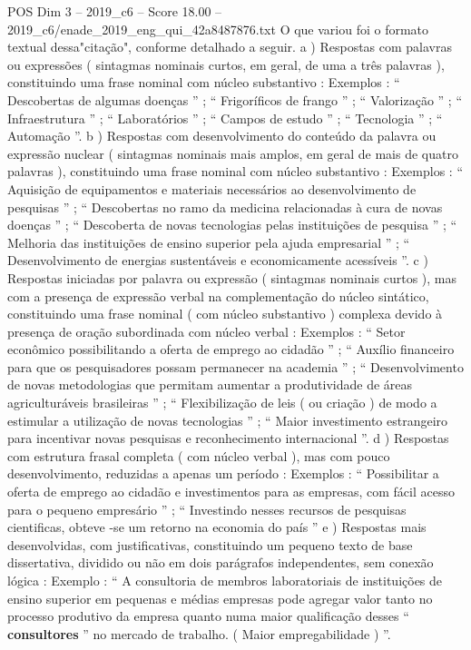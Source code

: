 \begin{textsample}{POS Dim 3 – 2019\_c6 – Score 18.00 – 2019\_c6/enade\_2019\_eng\_qui\_42a8487876.txt}
O que variou foi o formato textual dessa"citação", conforme detalhado a seguir. a ) Respostas com palavras ou expressões ( sintagmas nominais curtos, em geral, de uma a três palavras ), constituindo uma frase nominal com núcleo substantivo : Exemplos : “ Descobertas de algumas doenças ” ; “ Frigoríficos de frango ” ; “ Valorização ” ; “ Infraestrutura ” ; “ Laboratórios ” ; “ Campos de estudo ” ; “ Tecnologia ” ; “ Automação ”. b ) Respostas com desenvolvimento do conteúdo da palavra ou expressão nuclear ( sintagmas nominais mais amplos, em geral de mais de quatro palavras ), constituindo uma frase nominal com núcleo substantivo : Exemplos : “ Aquisição de equipamentos e materiais necessários ao desenvolvimento de pesquisas ” ; “ Descobertas no ramo da medicina relacionadas à cura de novas doenças ” ; “ Descoberta de novas tecnologias pelas instituições de pesquisa ” ; “ Melhoria das instituições de ensino superior pela ajuda empresarial ” ; “ Desenvolvimento de energias sustentáveis e economicamente acessíveis ”. c ) Respostas iniciadas por palavra ou expressão ( sintagmas nominais curtos ), mas com a presença de expressão verbal na complementação do núcleo sintático, constituindo uma frase nominal ( com núcleo substantivo ) complexa devido à presença de oração subordinada com núcleo verbal : Exemplos : “ Setor econômico possibilitando a oferta de emprego ao cidadão ” ; “ Auxílio financeiro para que os pesquisadores possam permanecer na academia ” ; “ Desenvolvimento de novas metodologias que permitam aumentar a produtividade de áreas agriculturáveis brasileiras ” ; “ Flexibilização de leis ( ou criação ) de modo a estimular a utilização de novas tecnologias ” ; “ Maior investimento estrangeiro para incentivar novas pesquisas e reconhecimento internacional ”. d ) Respostas com estrutura frasal completa ( com núcleo verbal ), mas com pouco desenvolvimento, reduzidas a apenas um período : Exemplos : “ Possibilitar a oferta de emprego ao cidadão e investimentos para as empresas, com fácil acesso para o pequeno empresário ” ; “ Investindo nesses recursos de pesquisas cientificas, obteve -se um retorno na economia do país ” e ) Respostas mais desenvolvidas, com justificativas, constituindo um pequeno texto de base dissertativa, dividido ou não em dois parágrafos independentes, sem conexão lógica : Exemplo : “ A consultoria de membros laboratoriais de instituições de ensino superior em pequenas e médias empresas pode agregar valor tanto no processo produtivo da empresa quanto numa maior qualificação desses “ \textbf{consultores} ” no mercado de trabalho. ( Maior empregabilidade ) ”.

\end{textsample}
